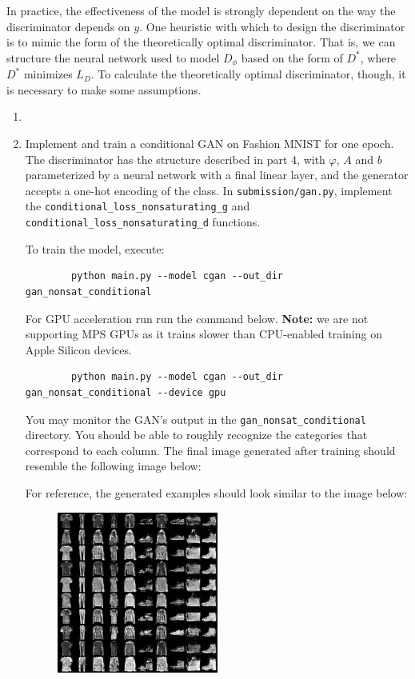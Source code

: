 In practice, the effectiveness of the model is strongly dependent on the way the discriminator depends on $y$. 
One heuristic with which to design the discriminator is to mimic the form of the theoretically optimal discriminator. 
That is, we can structure the neural network used to model $D_{\phi}$ based on the form of $D^{*}$, where $D^{*}$ minimizes $L_D$. 
To calculate the theoretically optimal discriminator, though, it is necessary to make some assumptions.

\begin{enumerate}[label=(\alph*)]
    \item 

    \item {} Implement and train a conditional GAN on Fashion MNIST for one epoch. The discriminator has the structure 
    described in part 4\label{4a}, with $\varphi$, $A$ and $b$ parameterized by a neural network with a final linear layer, 
    and the generator accepts a one-hot encoding of the class. In \texttt{submission/gan.py}, implement the 
    \texttt{conditional\_loss\_nonsaturating\_g} and \texttt{conditional\_loss\_nonsaturating\_d} functions. 
    
    To train the model, execute:
    \begin{verbatim}
        python main.py --model cgan --out_dir gan_nonsat_conditional
    \end{verbatim} 

    For GPU acceleration run run the command below. \textbf{Note:} we are not supporting MPS GPUs as it trains slower than CPU-enabled training on Apple Silicon devices.
    \begin{verbatim}
        python main.py --model cgan --out_dir gan_nonsat_conditional --device gpu
    \end{verbatim} 

    You may monitor the GAN's output in 
    the \texttt{gan\_nonsat\_conditional} directory. You should be able to roughly recognize the 
    categories that correspond to each column. The final image generated after training should resemble the following image below:

    For reference, the generated examples should look similar to the image below:
    \begin{figure}[h]
        \centering
        \includegraphics[width=0.5\textwidth]{./figures/cgan_nonsat_0900}
    \end{figure}

\end{enumerate}
